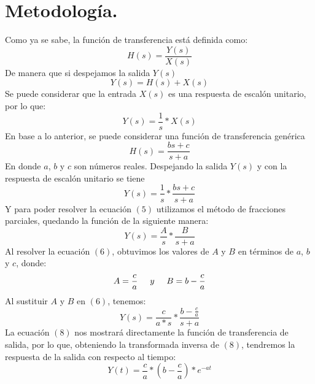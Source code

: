 \documentclass[letterpaper]{article}
\begin{document}
	\section{Metodología.}
	Como ya se sabe, la función de transferencia está definida como:
	\begin{equation}
	H(s)=\frac{Y(s)}{X(s)}
	\end{equation}
	De manera que si despejamos la salida $ Y(s) $
	\begin{equation}
	Y(s)=H(s)+X(s)
	\end{equation}
	Se puede considerar que la entrada $ X(s) $ es una respuesta de escalón unitario, por lo que:
	\begin{equation}
	Y(s)=\frac{1}{s} * X(s)
	\end{equation}	
	En base a lo anterior, se puede considerar una función de transferencia genérica
	\begin{equation}
	H(s)=\frac{bs+c}{s+a}
	\end{equation}
	En donde $ a $, $ b $ y $ c $ son números reales. Despejando la salida $ Y(s) $ y con la respuesta de escalón unitario se tiene
	\begin{equation}
	Y(s)=\frac{1}{s} * \frac{bs+c}{s+a}
	\end{equation}
	Y para poder resolver la ecuación $ (5) $ utilizamos el método de fracciones parciales, quedando la función de la siguiente manera:
	\begin{equation}
	Y(s)=\frac{A}{s} * \frac{B}{s+a}
	\end{equation}
	Al resolver la ecuación $ (6) $, obtuvimos los valores de $ A $ y $ B $ en términos de $ a $, $ b $ y $ c $, donde:
	\begin{equation}
	A=\frac{c}{a}\hspace{0.5cm}y\hspace{0.5cm}B=b-\frac{c}{a}
	\end{equation}
	Al sustituir $ A $ y $ B $ en $ (6) $, tenemos:
	\begin{equation}
	Y(s)=\frac{c}{a*s} * \frac{b-\frac{c}{a}}{s+a}
	\end{equation}
	La ecuación $ (8) $ nos mostrará directamente la función de transferencia de salida, por lo que, obteniendo la transformada inversa de $ (8) $, tendremos la respuesta de la salida con respecto al tiempo:
	\begin{equation}
	Y(t)=\frac{c}{a}*(b-\frac{c}{a})*e^{-at}
	\end{equation}
	
\end{document}
